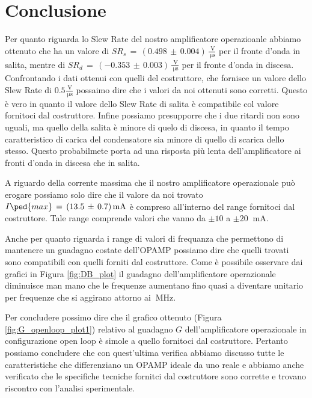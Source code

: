 \section*{Conclusione}

Per quanto riguarda lo Slew Rate del nostro amplificatore operazioanle abbiamo ottenuto che ha un valore di $SR_s\,=\,(0.498\,\pm\,0.004)\,\frac{\SI{}{\volt}}{\SI{}{\micro\second}}$ per il fronte d'onda in salita, mentre di $SR_d\,=\,(-0.353\,\pm\,0.003)\,\frac{\SI{}{\volt}}{\SI{}{\micro\second}}$ per il fronte d'onda in discesa. Confrontando i dati ottenui con quelli del costruttore, che fornisce un valore dello Slew Rate di $0.5 \frac{\SI{}{\volt}}{\SI{}{\micro\second}}$ possaimo dire che i valori da noi ottenuti sono corretti. Questo è vero in quanto il valore dello Slew Rate di salita è compatibile col valore fornitoci dal costruttore. Infine possiamo presupporre che i due ritardi non sono uguali, ma quello della salita è minore di quelo di discesa, in quanto il tempo caratteristico di carica del condensatore sia minore di quello di scarica dello stesso. Questo probabilmete porta ad una risposta più lenta dell'amplificatore ai fronti d'onda in discesa che in salita.

A riguardo della corrente massima che il nostro amplificatore operazionale può erogare possiamo solo dire che il valore da noi trovato $I\ped{max}\,=\,(13.5\,\pm\,0.7)\,\SI{}{\milli\ampere}$ è compreso all'interno del range fornitoci dal costruttore. Tale range comprende valori che vanno da $\pm10$ a $\pm20$ $\SI{}{\milli\ampere}$.

Anche per quanto riguarda i range di valori di frequanza che permettono di mantenere un guadagno costate dell'OPAMP possiamo dire che quelli trovati sono compatibili con quelli forniti dal costruttore. Come è possibile osservare dai grafici in Figura \ref{fig:DB_plot} il guadagno dell'amplificatore operazionale diminuisce man mano che le frequenze aumentano fino quasi a diventare unitario per frequenze che si aggirano attorno ai $\SI{}{\mega\hertz}$.

Per concludere possimo dire che il grafico ottenuto (Figura \ref{fig:G_openloop_plot1}) relativo al guadagno $G$ dell'amplificatore operazionale in configurazione open loop è simole a quello fornitoci dal costruttore. Pertanto possiamo concludere che con quest'ultima verifica abbiamo discusso tutte le caratteristiche che differenziano un OPAMP ideale da uno reale e abbiamo anche verificato che le specifiche tecniche fornitci dal costruttore sono corrette e trovano riscontro con l'analisi sperimentale.

